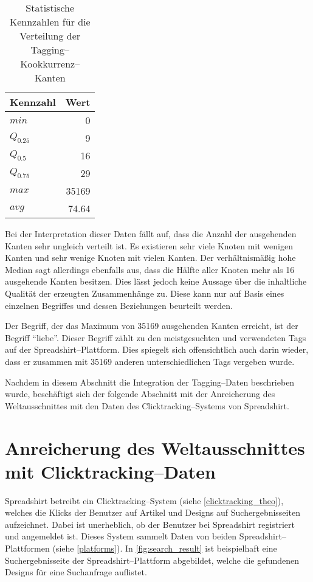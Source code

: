 \begin{table}[ht]
\centering
\begin{tabular}{lr}
    \toprule
    Kennzahl & Wert \\
    \midrule
    \(min\) & \num{0} \\
    \(Q_{0.25}\) & \num{9} \\
    \(Q_{0.5}\) & \num{16} \\
    \(Q_{0.75}\) & \num{29} \\
    \(max\) &  \num{35169} \\
    \(avg\) &  \num{74,64} \\
    \bottomrule
\end{tabular}
\caption{Statistische Kennzahlen für die Verteilung der Tagging--Kookkurrenz--Kanten}
\label{tab:only_tags}
\end{table}

Bei der Interpretation dieser Daten fällt auf, dass die Anzahl der ausgehenden Kanten sehr ungleich verteilt ist. Es existieren sehr viele Knoten mit wenigen Kanten und sehr wenige Knoten mit vielen Kanten. Der verhältnismäßig hohe Median sagt allerdings ebenfalls aus, dass die Hälfte aller Knoten mehr als \num{16} ausgehende Kanten besitzen. Dies lässt jedoch keine Aussage über die inhaltliche Qualität der erzeugten Zusammenhänge zu. Diese kann nur auf Basis eines einzelnen Begriffes und dessen Beziehungen beurteilt werden.

Der Begriff, der das Maximum von \num{35169} ausgehenden Kanten erreicht, ist der Begriff ``liebe''. Dieser Begriff zählt zu den meistgesuchten und verwendeten Tags auf der Spreadshirt--Plattform. Dies spiegelt sich offensichtlich auch darin wieder, dass er zusammen mit \num{35169} anderen unterschiedlichen Tags vergeben wurde.

Nachdem in diesem Abschnitt die Integration der Tagging--Daten beschrieben wurde, beschäftigt sich der folgende Abschnitt mit der Anreicherung des Weltausschnittes mit den Daten des Clicktracking--Systems von Spreadshirt.

\section{Anreicherung des Weltausschnittes mit Clicktracking--Daten}
\label{clicktracking}

Spreadshirt betreibt ein Clicktracking--System (siehe \cref{clicktracking_theo}), welches die Klicks der Benutzer auf Artikel und Designs auf Suchergebnisseiten aufzeichnet. Dabei ist unerheblich, ob der Benutzer bei Spreadshirt registriert und angemeldet ist. Dieses System sammelt Daten von beiden Spreadshirt--Plattformen (siehe \cref{platforms}). In \cref{fig:search_result} ist beispielhaft eine Suchergebnisseite der Spreadshirt--Plattform abgebildet, welche die gefundenen Designs für eine Suchanfrage auflistet.

